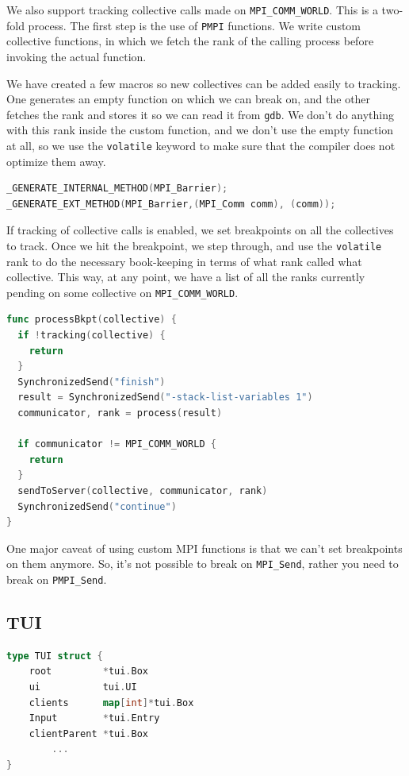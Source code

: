 \documentclass[10pt,conference]{IEEEtran}
\begin{document}
We also support tracking collective calls made on \texttt{MPI\_COMM\_WORLD}. This is a two-fold process. The first step is the use of \texttt{PMPI} functions. We write custom collective functions, in which we fetch the rank of the calling process before invoking the actual function.

We have created a few macros so new collectives can be added easily to tracking. One generates an empty function on which we can break on, and the other fetches the rank and stores it so we can read it from \texttt{gdb}. We don't do anything with this rank inside the custom function, and we don't use the empty function at all, so we use the \texttt{volatile} keyword to make sure that the compiler does not optimize them away.

\begin{samepage}
\begin{lstlisting}[language=C, caption=Collective call instrumentation]
_GENERATE_INTERNAL_METHOD(MPI_Barrier);
_GENERATE_EXT_METHOD(MPI_Barrier,(MPI_Comm comm), (comm));
\end{lstlisting}
\end{samepage}

If tracking of collective calls is enabled, we set breakpoints on all the collectives to track. Once we hit the breakpoint, we step through, and use the \texttt{volatile} rank to do the necessary book-keeping in terms of what rank called what collective. This way, at any point, we have a list of all the ranks currently pending on some collective on \texttt{MPI\_COMM\_WORLD}.

\begin{samepage}
  \begin{lstlisting}[language=Go, caption=Pseudocode for processing collectives inside Go]
func processBkpt(collective) {
  if !tracking(collective) {
    return
  }
  SynchronizedSend("finish")
  result = SynchronizedSend("-stack-list-variables 1")
  communicator, rank = process(result)

  if communicator != MPI_COMM_WORLD {
    return
  }
  sendToServer(collective, communicator, rank)
  SynchronizedSend("continue")
}
\end{lstlisting}
\end{samepage}


One major caveat of using custom MPI functions is that we can't set breakpoints on them anymore. So, it's not possible to break on \texttt{MPI\_Send}, rather you need to break on \texttt{PMPI\_Send}.

\subsection{TUI}
\begin{samepage}
  \begin{lstlisting}[language=Go, caption=Struct for the complete interface]
    type TUI struct {
	root         *tui.Box
	ui           tui.UI
	clients      map[int]*tui.Box
	Input        *tui.Entry
	clientParent *tui.Box
        ...
}
\end{lstlisting}
\end{samepage}
\end{document}

